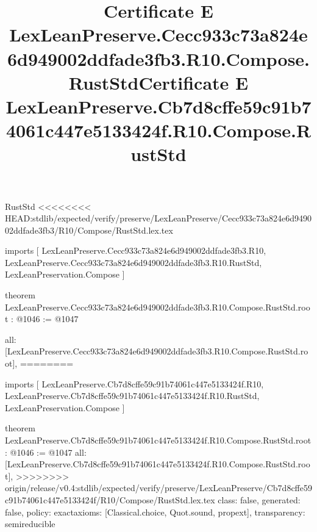 \begin{lexlean}{RustStd}
<<<<<<<< HEAD:stdlib/expected/verify/preserve/LexLeanPreserve/Cecc933c73a824e6d949002ddfade3fb3/R10/Compose/RustStd.lex.tex
\title{Certificate E LexLeanPreserve.Cecc933c73a824e6d949002ddfade3fb3.R10.Compose.RustStd}
\begin{coremodule}
imports [
  LexLeanPreserve.Cecc933c73a824e6d949002ddfade3fb3.R10,
  LexLeanPreserve.Cecc933c73a824e6d949002ddfade3fb3.R10.RustStd,
  LexLeanPreservation.Compose
]

theorem LexLeanPreserve.Cecc933c73a824e6d949002ddfade3fb3.R10.Compose.RustStd.root : @1046 := @1047 {
  all: [LexLeanPreserve.Cecc933c73a824e6d949002ddfade3fb3.R10.Compose.RustStd.root],
========
\title{Certificate E LexLeanPreserve.Cb7d8cffe59c91b74061c447e5133424f.R10.Compose.RustStd}
\begin{coremodule}
imports [
  LexLeanPreserve.Cb7d8cffe59c91b74061c447e5133424f.R10,
  LexLeanPreserve.Cb7d8cffe59c91b74061c447e5133424f.R10.RustStd,
  LexLeanPreservation.Compose
]

theorem LexLeanPreserve.Cb7d8cffe59c91b74061c447e5133424f.R10.Compose.RustStd.root : @1046 := @1047 {
  all: [LexLeanPreserve.Cb7d8cffe59c91b74061c447e5133424f.R10.Compose.RustStd.root],
>>>>>>>> origin/release/v0.4:stdlib/expected/verify/preserve/LexLeanPreserve/Cb7d8cffe59c91b74061c447e5133424f/R10/Compose/RustStd.lex.tex
  class: false,
  generated: false,
  policy: exact{axioms: [Classical.choice, Quot.sound, propext]},
  transparency: semireducible
}


\end{coremodule}}
\end{coremodule}
\end{lexlean}
